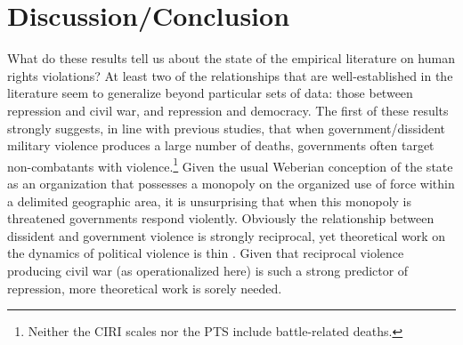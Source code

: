 \documentclass[12pt]{article}
\begin{document}
\section{Discussion/Conclusion}

What do these results tell us about the state of the empirical literature on human rights violations? At least two of the relationships that are well-established in the literature seem to generalize beyond particular sets of data: those between repression and civil war, and repression and democracy. The first of these results strongly suggests, in line with previous studies, that when government/dissident military violence produces a large number of deaths, governments often target non-combatants with violence.\footnote{Neither the CIRI scales nor the PTS include battle-related deaths.} Given the usual Weberian conception of the state as an organization that possesses a monopoly on the organized use of force within a delimited geographic area, it is unsurprising that when this monopoly is threatened governments respond violently. Obviously the relationship between dissident and government violence is strongly reciprocal, yet theoretical work on the dynamics of political violence is thin \citep[But see, e.g.][]{Moore2000,Pierskalla2010,RitterJCR}. Given that reciprocal violence producing civil war (as operationalized here) is such a strong predictor of repression, more theoretical work is sorely needed. 
\end{document}
